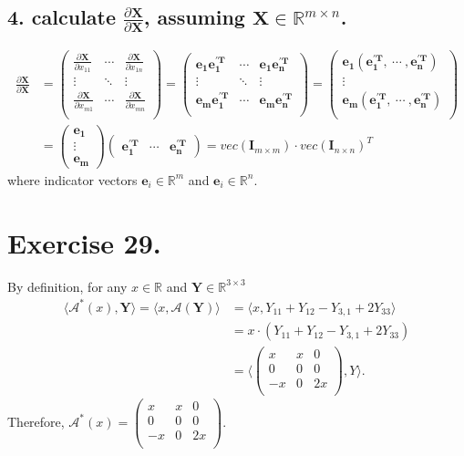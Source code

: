 \documentclass{article}
\begin{document}
\subsection{4. calculate $\frac{\partial\mathbf X}{\partial\mathbf X}$, assuming $\mathbf X \in \mathbb{R}^{m\times n}$.}
\begin{align*}
\frac{\partial\mathbf X}{\partial\mathbf X}& = 
\begin{pmatrix}
\frac{\partial \mathbf X}{\partial x_{11}}&\cdots&\frac{\partial \mathbf X}{\partial x_{1n}}\\
\vdots&\ddots&\vdots \\
\frac{\partial \mathbf X}{\partial x_{m1}}&\cdots&\frac{\partial \mathbf X}{\partial x_{mn}}\\
\end{pmatrix}
=
\begin{pmatrix}
\mathbf{e_1 e_{1}^{'T}}&\cdots&\mathbf{e_1 e^{'T}_{n}}\\
\vdots&\ddots&\vdots \\
\mathbf{e_m e_{1}^{'T}}&\cdots&\mathbf{e_m e_{n}^{'T}}\\
\end{pmatrix}
=
\begin{pmatrix}
\mathbf{e_1(e_{1}^{'T},\ \cdots\ ,e_{n}^{'T})}\\
\vdots\\
\mathbf{e_m(e_{1}^{'T},\ \cdots\ ,e_{n}^{'T})}\\
\end{pmatrix}\\
&=
\begin{pmatrix}
\mathbf{e_1}\\
\vdots\\
\mathbf{e_m}
\end{pmatrix}
\begin{pmatrix}
\mathbf{e_{1}^{'T}}&\cdots&\mathbf{e_{n}^{'T}}
\end{pmatrix}
= vec(\mathbf I_{m\times m})\cdot vec(\mathbf I_{n\times n})^{T}
\end{align*}
where indicator vectors $\mathbf e_i \in \mathbb R^{m}$ and $\mathbf e_i \in \mathbb R^{n}$.
\section{Exercise 29.}
By definition, for any $x\in \mathbb R$ and $\mathbf Y \in \mathbb R^{3 \times 3}$
\begin{align*}
\langle \mathcal A^{*}(x), \mathbf Y \rangle = \langle x,\mathcal A(\mathbf Y)\rangle
&= \langle x, Y_{11}+ Y_{12} - Y_{3,1} + 2Y_{33} \rangle\\
&= x\cdot(Y_{11}+ Y_{12} - Y_{3,1} + 2Y_{33})\\
&= \langle 
\begin{pmatrix}
x&x&0\\
0&0&0\\
-x&0&2x\\
\end{pmatrix},
Y
\rangle. 
\end{align*}
Therefore, $\mathcal A^{*}(x)= 
\begin{pmatrix}
x&x&0\\
0&0&0\\
-x&0&2x\\
\end{pmatrix}
$.
\end{document}

